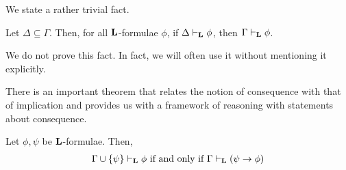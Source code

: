 We state a rather trivial fact.

\begin{boxlemma}\label{Ch1:Lemma:SubsetOfGamma}
    Let $\Delta \subseteq \Gamma$. Then, for all $\mathbf{L}$-formulae $\phi$, if $\Delta \vdash_{\mathbf{L}} \phi$, then $\Gamma \vdash_{\mathbf{L}} \phi$.
\end{boxlemma}

We do not prove this fact. In fact, we will often use it without mentioning it explicitly.

There is an important theorem that relates the notion of consequence with that of implication and provides us with a framework of reasoning with statements about consequence.

\begin{boxtheorem}\label{Ch1:Thm:DeductionThm} %
    Let $\phi, \psi$ be $\mathbf{L}$-formulae. Then,
    \begin{align*}
        \Gamma \cup \left\{ \psi \right\} \vdash_{\mathbf{L}} \phi
        \text{ if and only if }
        \Gamma \vdash_{\mathbf{L}} \left( \psi \to \phi \right)
    \end{align*}
\end{boxtheorem}
